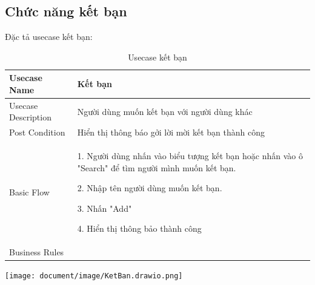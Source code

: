 \subsection{Chức năng kết bạn}
Đặc tả usecase kết bạn: 
\begin{table}[H]
    \centering
	\begin{tabular}{|p{5cm}|p{10cm}|}
    
    \hline
    Usecase Name&Kết bạn\\
    \hline
    Usecase Description&Người dùng muốn kết bạn với người dùng khác\\
    \hline
    Post Condition&Hiển thị thông báo gởi lời mời kết bạn thành công \\
    \hline
    Basic Flow& 1. Người dùng nhấn vào biểu tượng kết bạn hoặc nhấn vào ô "Search" để tìm người mình muốn kết bạn.
    
    2. Nhập tên người dùng muốn kết bạn.
    
    3. Nhấn "Add"
    
    4. Hiển thị thông bảo thành công\\
    

    \hline Business Rules& \\
   
   
	\hline
\end{tabular}
\caption{Usecase kết bạn}
\end{table}
 \begin{center}
  \captionsetup{type=figure}
  \texttt{[image: document/image/KetBan.drawio.png]}
\end{center}

